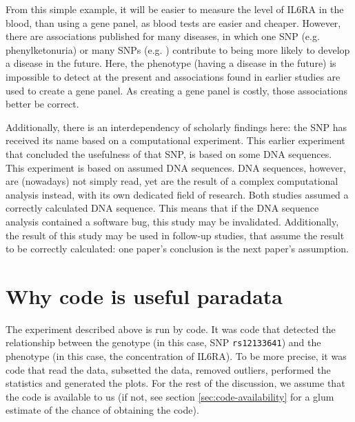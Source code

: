 From this simple example, it will be easier
to measure the level of IL6RA in the blood, than using a gene panel,
as blood tests are easier and cheaper.
However, there are associations published for many diseases,
in which one SNP (e.g. phenylketonuria) or many SNPs (e.g. \cite{bruce2009metabolic}) 
contribute to being more likely to develop a disease in the future. 
Here, the phenotype (having a disease in the future) 
is impossible to detect at the present
and associations found in earlier studies are used to create a gene panel.
As creating a gene panel is costly, those associations better be correct.

Additionally, there is an interdependency of scholarly findings here:
the SNP has received its name based on a computational experiment.
This earlier experiment that concluded the usefulness of that SNP, 
is based on some DNA sequences.
This experiment is based on assumed DNA sequences.
DNA sequences, however, are (nowadays) not simply read, 
yet are the result of a complex computational analysis instead,
with its own dedicated field of research.
Both studies assumed a correctly calculated DNA sequence.
This means that if the DNA sequence analysis contained a software bug, 
this study may be invalidated. 
Additionally, the result of this study may be used in follow-up studies,
that assume the result to be correctly calculated: one paper's conclusion
is the next paper's assumption.

\section{Why code is useful paradata}


The experiment described above is run by code. 
It was code that detected the relationship between the genotype
(in this case, SNP \verb|rs12133641|) 
and the phenotype (in this case, the concentration of IL6RA).
To be more precise, it was code that read the data,
subsetted the data, removed outliers, 
performed the statistics and generated the plots.
For the rest of the discussion, we assume that the
code is available to us (if not, see section \ref{sec:code-availability} 
for a glum estimate of the chance of obtaining the code).

